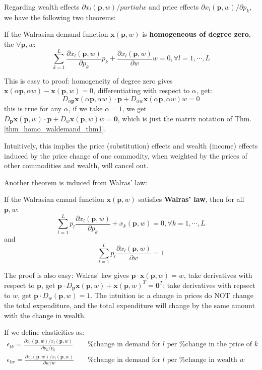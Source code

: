 Regarding wealth effects $\partial x_l(\mathbf{p},w)/partial w$ and price effects $\partial x_l(\mathbf{p},w)/\partial p_k$, we have the following two theorems:

\begin{theorem}\label{thm_homo_waldemand_thm1}
    If the Walrasian demand function $\mathbf{x}(\mathbf{p},w)$ is \textbf{homogeneous of degree zero}, the $\forall \mathbf{p},w$:
    $$\sum^L_{k=1}\frac{\partial x_l(\mathbf{p},w)}{\partial p_k}p_k +\frac{\partial x_l(\mathbf{p},w)}{\partial w}w=0,\forall l=1,\cdots,L$$
\end{theorem}

This is easy to proof: homogeneity of degree zero gives $\mathbf{x}(\alpha \mathbf{p},\alpha w)-\mathbf{x}(\mathbf{p},w)=0$, differentiating with respect to $\alpha$, get:
$$D_{\alpha \mathbf{p}}\mathbf{x}(\alpha \mathbf{p},\alpha w)\cdot \mathbf{p} + D_{\alpha w} \mathbf{x}(\alpha \mathbf{p},\alpha w)w=0$$
this is true for any $\alpha$, if we take $\alpha=1$, we get $D_{\mathbf{p}}\mathbf{x}(\mathbf{p}, w)\cdot \mathbf{p} + D_{ w} \mathbf{x}( \mathbf{p}, w)w=\mathbf{0}$, which is just the matrix notation of Thm.\ref{thm_homo_waldemand_thm1}.

Intuitively, this implies the price (substitution) effects and wealth (income) effects induced by the price change of one commodity, when weighted by the prices of other commodities and wealth, will cancel out.

Another theorem is induced from Walras' law:
\begin{theorem}\label{thm_walraslaw_waldemand_thm2}
    If the Walrasian emand function $\mathbf{x}(\mathbf{p},w)$ satisfies \textbf{Walras' law}, then for all $\mathbf{p},w$:
    $$\sum^L_{l=1}p_l\frac{\partial x_l(\mathbf{p},w)}{\partial p_k}+x_k(\mathbf{p},w)=0,\forall k=1,\cdots,L$$
    and
    $$\sum^L_{l=1}p_l\frac{\partial x_l(\mathbf{p},w)}{\partial w}=1$$
\end{theorem}

The proof is also easy: Walras' law gives $\mathbf{p}\cdot \mathbf{x}(\mathbf{p},w)=w$, take derivatives with respect to $\mathbf{p}$, get $\mathbf{p}\cdot D_{\mathbf{p}}\mathbf{x}(\mathbf{p},w)+\mathbf{x}(\mathbf{p},w)^T=\mathbf{0}^T$; take derivatives with repsect to $w$, get $\mathbf{p}\cdot D_{w}(\mathbf{p},w)=1$. The intuition is: a change in prices do NOT change the total expenditure, and the total expenditure will change by the same amount with the change in wealth.

If we define elasticities as:
\begin{align*} 
    \epsilon_{lk}=\frac{\partial x_l(\mathbf{p},w)/x_l(\mathbf{p},w)}{\partial p_k /p_k} && \text{ \% change in demand for $l$ per \% change in the price of $k$} \\ 
    \epsilon_{lw}=\frac{\partial x_l(\mathbf{p},w)/x_l(\mathbf{p},w)}{\partial w/w} && \text{ \% change in demand for $l$ per \% change in wealth $w$}
\end{align*}

